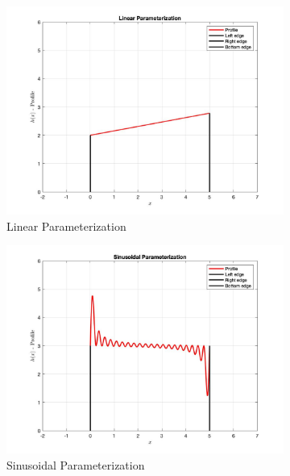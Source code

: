 \documentclass{article}
\begin{document}
\begin{figure}[h]
     \centering
     \begin{subfigure}[b]{0.4\textwidth}
         \centering
         \includegraphics[width=\textwidth]{Linear_Parameterization}
         \caption{Linear Parameterization}
         \label{fig: linear}
     \end{subfigure}
     \hfill
     \begin{subfigure}[b]{0.4\textwidth}
         \centering
         \includegraphics[width=\textwidth]{Sinusoidal_Parameterization}
         \caption{Sinusoidal Parameterization}
         \label{fig:sinusoidal}
     \end{subfigure}
     \begin{subfigure}[b]{0.4\textwidth}

\end{subfigure}
\end{figure}
\end{document}
